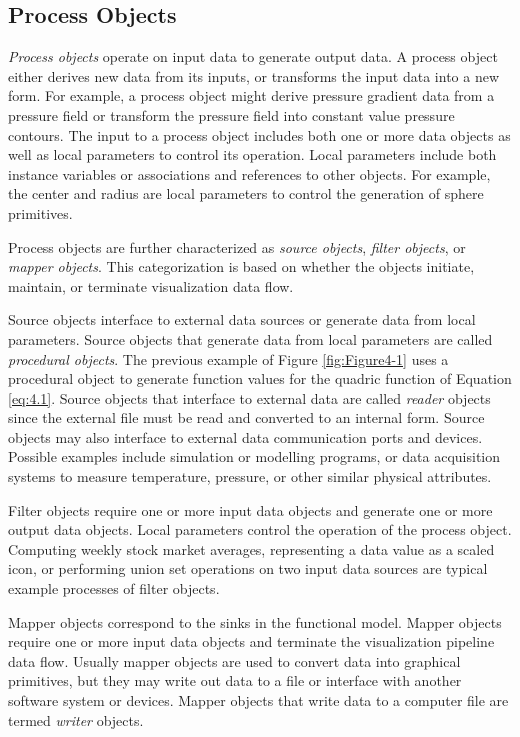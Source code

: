 \subsection{Process Objects}
\label{subsec:process_objects}

\emph{Process objects} operate on input data to generate output data. A process object either derives new data from its inputs, or transforms the input data into a new form. For example, a process object might derive pressure gradient data from a pressure field or transform the pressure field into constant value pressure contours. The input to a process object includes both one or more data objects as well as local parameters to control its operation. Local parameters include both instance variables or associations and references to other objects. For example, the center and radius are local parameters to control the generation of sphere primitives.

Process objects are further characterized as \emph{source objects}, \emph{filter objects}, or \emph{mapper objects}. This categorization is based on whether the objects initiate, maintain, or terminate visualization data flow.

Source objects interface to external data sources or generate data from local parameters. Source objects that generate data from local parameters are called \emph{procedural objects}. The previous example of Figure \ref{fig:Figure4-1} uses a procedural object to generate function values for the quadric function of Equation \ref{eq:4.1}. Source objects that interface to external data are called \emph{reader} objects since the external file must be read and converted to an internal form. Source objects may also interface to external data communication ports and devices. Possible examples include simulation or modelling programs, or data acquisition systems to measure temperature, pressure, or other similar physical attributes.

Filter objects require one or more input data objects and generate one or more output data objects. Local parameters control the operation of the process object. Computing weekly stock market averages, representing a data value as a scaled icon, or performing union set operations on two input data sources are typical example processes of filter objects.

Mapper objects correspond to the sinks in the functional model. Mapper objects require one or more input data objects and terminate the visualization pipeline data flow. Usually mapper objects are used to convert data into graphical primitives, but they may write out data to a file or interface with another software system or devices. Mapper objects that write data to a computer file are termed \emph{writer} objects.

